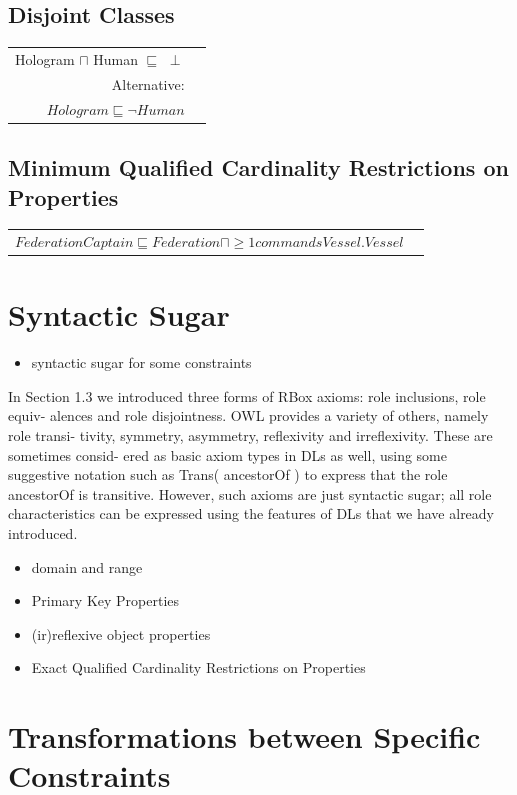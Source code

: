 \documentclass{llncs}
\newenvironment{DL}{
	\begin{center}
  \begin{tabular}{r l}

}{
  \end{tabular}
	\end{center}
}
\begin{document}
\subsection{Disjoint Classes}

\begin{DL}
Hologram $\sqcap$ Human $\sqsubseteq$ $\perp$\\
Alternative:\\
$Hologram \sqsubseteq \neg Human$
\end{DL}

\subsection{Minimum Qualified Cardinality Restrictions on Properties}

\begin{DL}
$FederationCaptain \sqsubseteq Federation \sqcap \geq1 commandsVessel . Vessel $
\end{DL}

\section{Syntactic Sugar}

\begin{itemize}
	\item syntactic sugar for some constraints
\end{itemize}

In Section 1.3 we introduced three forms of RBox axioms: role inclusions, role equiv-
alences and role disjointness. OWL provides a variety of others, namely role transi-
tivity, symmetry, asymmetry, reflexivity and irreflexivity. These are sometimes consid-
ered as basic axiom types in DLs as well, using some suggestive notation such as
Trans( ancestorOf ) to express that the role ancestorOf is transitive. However, such axioms
are just syntactic sugar; all role characteristics can be expressed using the features
of DLs that we have already introduced.

\begin{itemize}
  \item domain and range
	\item Primary Key Properties
	\item (ir)reflexive object properties
	\item Exact Qualified Cardinality Restrictions on Properties
\end{itemize}

\section{Transformations between Specific Constraints}
\end{document}
